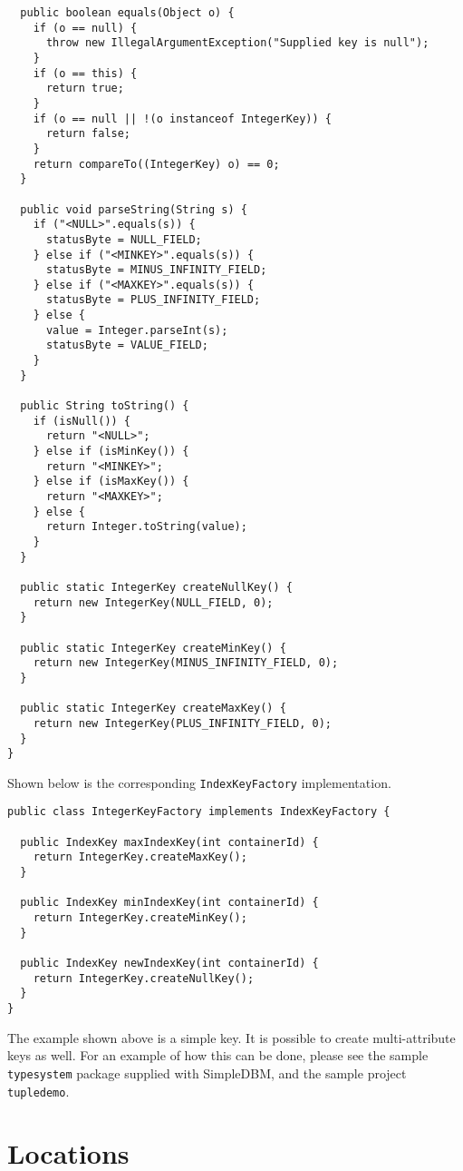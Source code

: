 \documentclass[a4paper,draft,oneside]{book}
\begin{document}
\begin{verbatim}
  public boolean equals(Object o) {
    if (o == null) {
      throw new IllegalArgumentException("Supplied key is null");
    }
    if (o == this) {
      return true;
    }
    if (o == null || !(o instanceof IntegerKey)) {
      return false;
    }
    return compareTo((IntegerKey) o) == 0;
  }

  public void parseString(String s) {
    if ("<NULL>".equals(s)) {
      statusByte = NULL_FIELD;
    } else if ("<MINKEY>".equals(s)) {
      statusByte = MINUS_INFINITY_FIELD;
    } else if ("<MAXKEY>".equals(s)) {
      statusByte = PLUS_INFINITY_FIELD;
    } else {
      value = Integer.parseInt(s);
      statusByte = VALUE_FIELD;
    }
  }

  public String toString() {
    if (isNull()) {
      return "<NULL>";
    } else if (isMinKey()) {
      return "<MINKEY>";
    } else if (isMaxKey()) {
      return "<MAXKEY>";
    } else {
      return Integer.toString(value);
    }
  }

  public static IntegerKey createNullKey() {
    return new IntegerKey(NULL_FIELD, 0);
  }

  public static IntegerKey createMinKey() {
    return new IntegerKey(MINUS_INFINITY_FIELD, 0);
  }

  public static IntegerKey createMaxKey() {
    return new IntegerKey(PLUS_INFINITY_FIELD, 0);
  }
}
\end{verbatim}

Shown below is the corresponding \verb|IndexKeyFactory| implementation.

\begin{verbatim}
public class IntegerKeyFactory implements IndexKeyFactory {

  public IndexKey maxIndexKey(int containerId) {
    return IntegerKey.createMaxKey();
  }

  public IndexKey minIndexKey(int containerId) {
    return IntegerKey.createMinKey();
  }

  public IndexKey newIndexKey(int containerId) {
    return IntegerKey.createNullKey();
  }
}
\end{verbatim}

The example shown above is a simple key. It is possible to create 
multi-attribute keys as well. For an example of how this can be done,
please see the sample \verb|typesystem| package supplied with SimpleDBM,
and the sample project \verb|tupledemo|.

\section{Locations}
\end{document}
